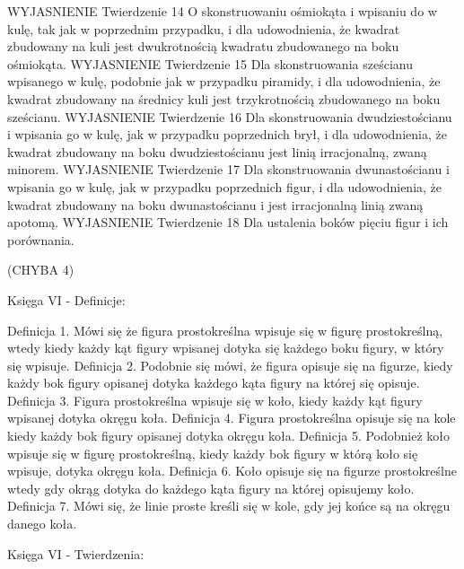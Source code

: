     WYJASNIENIE
Twierdzenie 14
    O skonstruowaniu ośmiokąta i wpisaniu do w kulę, tak jak w poprzednim przypadku, i dla udowodnienia, że kwadrat zbudowany na kuli jest dwukrotnością kwadratu zbudowanego na boku ośmiokąta.
    WYJASNIENIE
Twierdzenie 15
    Dla skonstruowania sześcianu wpisanego w kulę, podobnie jak w przypadku piramidy, i dla udowodnienia, że kwadrat zbudowany na średnicy kuli jest trzykrotnością zbudowanego na boku sześcianu.
    WYJASNIENIE
Twierdzenie 16
    Dla skonstruowania dwudziestościanu i wpisania go w kulę, jak w przypadku poprzednich brył, i dla udowodnienia, że kwadrat zbudowany na boku dwudziestościanu jest linią irracjonalną, zwaną minorem.
    WYJASNIENIE
Twierdzenie 17
    Dla skonstruowania dwunastościanu i wpisania go w kulę, jak w przypadku poprzednich figur, i dla udowodnienia, że kwadrat zbudowany na boku dwunastościanu i jest irracjonalną linią zwaną apotomą.
    WYJASNIENIE
Twierdzenie 18
    Dla ustalenia boków pięciu figur i ich porównania.











    (CHYBA 4)
    
Księga VI - Definicje:

Definicja 1.
    Mówi się że figura prostokreślna wpisuje się w figurę prostokreślną, wtedy kiedy każdy kąt figury wpisanej dotyka się każdego boku figury, w który się wpisuje. 
Definicja 2.
    Podobnie się mówi, że figura opisuje się na figurze, kiedy każdy bok figury opisanej dotyka każdego kąta figury na której się opisuje. 
Definicja 3.
    Figura prostokreślna wpisuje się w koło, kiedy każdy kąt figury wpisanej dotyka okręgu koła. 
Definicja 4.
    Figura prostokreślna opisuje się na kole kiedy każdy bok figury opisanej dotyka okręgu koła. 
Definicja 5.
    Podobnież koło wpisuje się w figurę prostokreślną, kiedy każdy bok figury w którą koło się wpisuje, dotyka okręgu koła. 
Definicja 6.
    Koło opisuje się na figurze prostokreślne wtedy gdy okrąg dotyka do każdego kąta figury na której opisujemy koło. 
Definicja 7.
    Mówi się, że linie proste kreśli się w kole, gdy jej końce są na okręgu danego koła. 


Księga VI - Twierdzenia:


